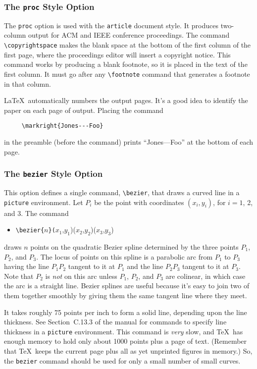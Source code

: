 \subsubsection{The {\tt proc} Style Option}

The {\tt proc} option is used with the \mbox{\tt article} document
style.  It produces two-column output for ACM and IEEE conference
proceedings.  The command \hbox{\verb|\copyrightspace|} makes the blank
space at the bottom of the first column of the first page, where the
proceedings editor will insert a copyright notice.  This command works
by producing a blank footnote, so it is placed in the text of the first
column.  It must go after any \hbox{\verb|\footnote|} command that
generates a footnote in that column.

\LaTeX\ automatically numbers the output pages.  It's a good idea 
to identify the paper on each page of output.  Placing the command
\begin{verbatim}
     \markright{Jones---Foo}
\end{verbatim}
in the preamble (before the \hbox{\verb||} command)
prints ``Jones---Foo'' at the bottom of each page.  

\subsubsection{The {\tt bezier} Style Option}

This option defines a single command, \hbox{\verb|\bezier|}, that draws
a curved line in a {\tt picture} environment.  Let $P_{i}$ be the point
with coordinates $(x_{i},y_{i})$, for $i=1$, 2, and 3.  The command
\begin{itemize} \tt
\item[]
\verb|\bezier{|$n$\verb|}(|$x_{1}$,$y_{1}$)($x_{2}$,$y_{2}$)($x_{3}$,$y_{3}$)
\end{itemize}
draws $n$ points on the quadratic Bezier spline determined by the three
points $P_{1}$, $P_{2}$, and $P_{3}$.  The locus of points on this
spline is a parabolic arc from $P_{1}$ to $P_{3}$ having the line
$P_{1}P_{2}$ tangent to it at $P_{1}$ and the line $P_{2}P_{3}$ tangent
to it at $P_{3}$.  Note that $P_{2}$ is {\em not\/} on this arc unless
$P_{1}$, $P_{2}$, and $P_{3}$ are colinear, in which case the arc is a
straight line.  Bezier splines are useful because it's easy to join two
of them together smoothly by giving them the same tangent line where
they meet.

It takes roughly 75 points per inch to form a solid line, depending
upon the line thickness.  See Section~C.13.3 of the manual for commands
to specify line thickness in a {\tt picture} environment.  This command
is {\em very\/} slow, and \TeX\ has enough memory to hold only about
1000 points plus a page of text.  (Remember that \TeX\ keeps the
current page plus all as yet unprinted figures in memory.) So, the
\verb|bezier| command should be used for only a small number of small
curves.


